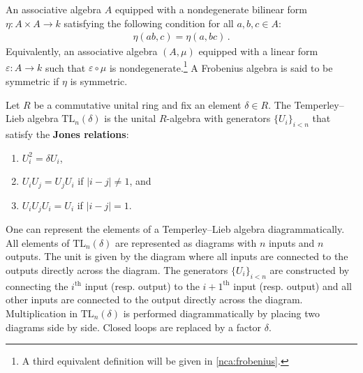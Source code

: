     \begin{example}\label{linalgebra:frobenius}
        An associative algebra $A$ equipped with a nondegenerate bilinear form $\eta:A\times A\rightarrow k$ satisfying the following condition for all $a,b,c\in A$:
        \begin{gather}
            \eta(ab,c)=\eta(a,bc)\,.
        \end{gather}
        Equivalently, an associative algebra $(A,\mu)$ equipped with a linear form $\varepsilon:A\rightarrow k$ such that $\varepsilon\circ\mu$ is nondegenerate.\footnote{A third equivalent definition will be given in \cref{nca:frobenius}.} A Frobenius algebra is said to be symmetric if $\eta$ is symmetric.
    \end{example}

    \begin{example}
        Let $R$ be a commutative unital ring and fix an element $\delta\in R$. The Temperley--Lieb algebra $\mathrm{TL}_n(\delta)$ is the unital $R$-algebra with generators $\{U_i\}_{i<n}$ that satisfy the \textbf{Jones relations}:
        \begin{enumerate}
            \item $U_i^2 = \delta U_i$,
            \item $U_i U_j = U_j U_i$ if $|i-j|\neq 1$, and
            \item $U_i U_j U_i = U_i$ if $|i-j| = 1$.
        \end{enumerate}
        One can represent the elements of a Temperley--Lieb algebra diagrammatically. All elements of $\mathrm{TL}_n(\delta)$ are represented as diagrams with $n$ inputs and $n$ outputs. The unit is given by the diagram where all inputs are connected to the outputs directly across the diagram. The generators $\{U_i\}_{i<n}$ are constructed by connecting the $i^{\text{th}}$ input (resp. output) to the $i+1^{\text{th}}$ input (resp. output) and all other inputs are connected to the output directly across the diagram. Multiplication in $\text{TL}_n(\delta)$ is performed diagrammatically by placing two diagrams side by side. Closed loops are replaced by a factor $\delta$.
    \end{example}

